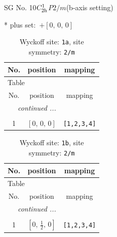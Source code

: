 \documentclass[fleqn,8pt]{jsarticle}
\begin{document}
\setcounter{MaxMatrixCols}{32}

\renewcommand{\tablename}{Table~}
\renewcommand{\figurename}{Figure~}
\begin{center}
\LARGE
SG No. 10\quad$C_{\rm 2h}^{1}$\quad$P2/m$\quad(b-axis setting)\quad[ monoclinic ]
\end{center}
* plus set:\,\,\,$+\left[ 0,\, 0,\, 0 \right]$
\renewcommand{\arraystretch}{1.2}
\begin{longtable}{ccc}
\caption{Wyckoff site: {\tt 1a}, site symmetry: {\tt 2/m}}
 \\
 \hline \hline
No. & position & mapping \\ \hline \endfirsthead

\multicolumn{2}{l}{\tablename\ \thetable{}} \\
 \hline \hline
No. & position & mapping \\ \hline \endhead

 \hline \hline
\multicolumn{2}{r}{\footnotesize\it continued ...} \\ \endfoot

 \hline \hline
\multicolumn{2}{r}{} \\ \endlastfoot

1 & $\left[ 0,\, 0,\, 0 \right]$ & {\tt [1,2,3,4]} \\
\end{longtable}
\renewcommand{\arraystretch}{1.2}
\begin{longtable}{ccc}
\caption{Wyckoff site: {\tt 1b}, site symmetry: {\tt 2/m}}
 \\
 \hline \hline
No. & position & mapping \\ \hline \endfirsthead

\multicolumn{2}{l}{\tablename\ \thetable{}} \\
 \hline \hline
No. & position & mapping \\ \hline \endhead

 \hline \hline
\multicolumn{2}{r}{\footnotesize\it continued ...} \\ \endfoot

 \hline \hline
\multicolumn{2}{r}{} \\ \endlastfoot

1 & $\left[ 0,\, \frac{1}{2},\, 0 \right]$ & {\tt [1,2,3,4]} \\
\end{longtable}
\renewcommand{\arraystretch}{1.2}
\end{document}
